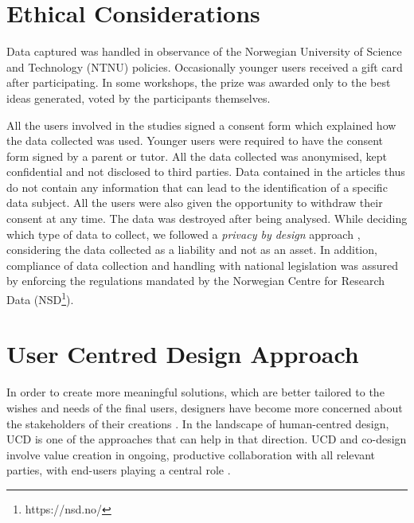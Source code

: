 \section{Ethical Considerations}

Data captured was handled in observance of the Norwegian University of Science and Technology (NTNU) policies. Occasionally younger users received a gift card after participating. In some workshops, the prize was awarded only to the best ideas generated, voted by the participants themselves.

All the users involved in the studies signed a consent form which explained how the data collected was used. Younger users were required to have the consent form signed by a parent or tutor. All the data collected was anonymised, kept confidential and not disclosed to third parties. Data contained in the articles thus do not contain any information that can lead to the identification of a specific data subject. All the users were also given the opportunity to withdraw their consent at any time. The data was destroyed after being analysed.
While deciding which type of data to collect, we followed a \textit{privacy by design} approach \autocite{cavoukian_privacy_2009}, considering the data collected as a liability and not as an asset. In addition, compliance of data collection and handling with national legislation was assured by enforcing the regulations mandated by the Norwegian Centre for Research Data (NSD\footnote{https://nsd.no/}).


\section{User Centred Design Approach}

In order to create more meaningful solutions, which are better tailored to the wishes and needs of the final users, designers have become more concerned about the stakeholders of their creations \autocite{sanders_co-creation_2008}. In the landscape of human-centred design, UCD is one of the approaches that can help in that direction.
UCD and co-design involve value creation in ongoing, productive collaboration with all relevant parties, with end-users playing a central role \autocite{jansen_7_2017}.

